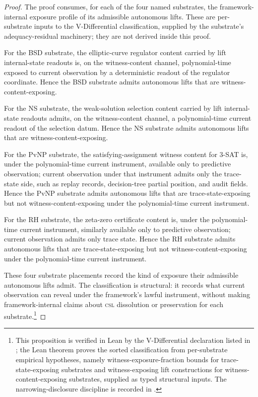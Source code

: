 \documentclass[11pt]{article}
\newcommand{\CSL}{\textsc{csl}}            \newcommand{\CSLcore}{Candidate Structural Law}
\theoremstyle{definition}
\begin{document}
\begin{proof}
The proof consumes, for each of the four named substrates, the
framework-internal exposure profile of its admissible autonomous lifts.
These are per-substrate inputs to the V-Differential classification,
supplied by the substrate's adequacy-residual machinery; they are not
derived inside this proof.

For the BSD substrate, the elliptic-curve regulator content carried by
lift internal-state readouts is, on the witness-content channel,
polynomial-time exposed to current observation by a deterministic
readout of the regulator coordinate.  Hence the BSD substrate admits
autonomous lifts that are witness-content-exposing.

For the NS substrate, the weak-solution selection content carried by
lift internal-state readouts admits, on the witness-content channel, a
polynomial-time current readout of the selection datum.  Hence the NS
substrate admits autonomous lifts that are witness-content-exposing.

For the PvNP substrate, the satisfying-assignment witness content for
\(3\)-SAT is, under the polynomial-time current instrument, available
only to predictive observation; current observation under that
instrument admits only the trace-state side, such as replay records,
decision-tree partial position, and audit fields.  Hence the PvNP
substrate admits autonomous lifts that are trace-state-exposing but not
witness-content-exposing under the polynomial-time current instrument.

For the RH substrate, the zeta-zero certificate content is, under the
polynomial-time current instrument, similarly available only to
predictive observation; current observation admits only trace state.
Hence the RH substrate admits autonomous lifts that are
trace-state-exposing but not witness-content-exposing under the
polynomial-time current instrument.

These four substrate placements record the kind of exposure their
admissible autonomous lifts admit.  The classification is structural:
it records what current observation can reveal under the framework's
lawful instrument, without making framework-internal claims about
\CSL{} dissolution or preservation for each substrate.\footnote{This proposition is
verified in Lean by the V-Differential declaration listed in
; the Lean theorem proves the sorted
classification from per-substrate empirical hypotheses, namely
witness-exposure-fraction bounds for trace-state-exposing substrates and
witness-exposing lift constructions for witness-content-exposing
substrates, supplied as typed structural inputs.  The
narrowing-disclosure discipline is recorded in .}
\end{proof}
\end{document}
